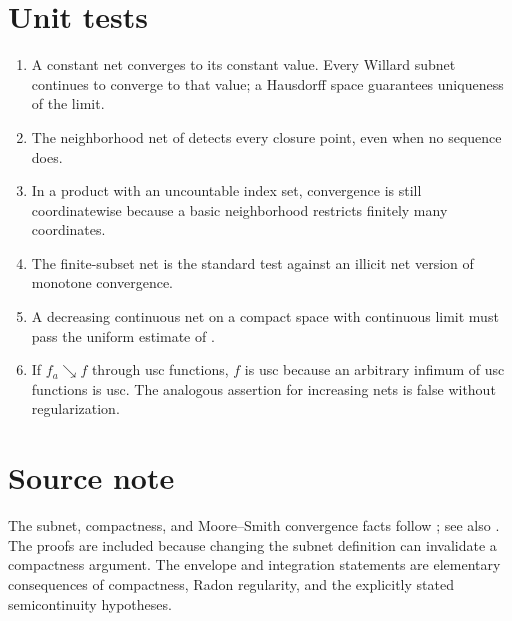 \section{Unit tests}
\label{sec:appE-unit-tests}

\begin{enumerate}
\item A constant net converges to its constant value.
      Every Willard subnet continues to converge to that value; a Hausdorff
      space guarantees uniqueness of the limit.
\item The neighborhood net of
       detects every closure point,
      even when no sequence does.
\item In a product with an uncountable index set, convergence is still
      coordinatewise because a basic neighborhood restricts finitely many
      coordinates.
\item The finite-subset net
       is the standard test
      against an illicit net version of monotone convergence.
\item A decreasing continuous net on a compact space with continuous limit
      must pass the uniform estimate of .
\item If \(f_a\searrow f\) through usc functions, \(f\) is usc because an
      arbitrary infimum of usc functions is usc.
      The analogous assertion for increasing nets is false without
      regularization.
\end{enumerate}

\section*{Source note}
\label{sec:appE-source-note}

The subnet, compactness, and Moore--Smith convergence facts follow
\cite[Chapters~4--5]{Wil70}; see also \cite{Kel75}.
The proofs are included because changing the subnet definition can invalidate
a compactness argument.
The envelope and integration statements are elementary consequences of
compactness, Radon regularity, and the explicitly stated semicontinuity
hypotheses.
